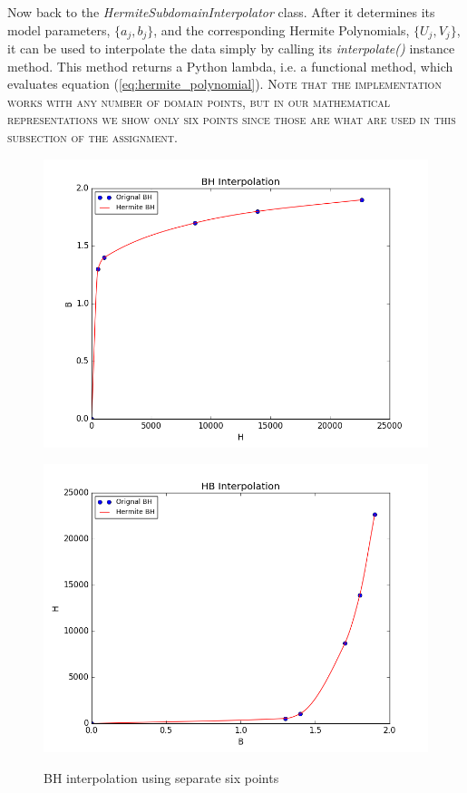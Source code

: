 \documentclass[11pt]{article}
\begin{document}
Now back to the \textit{HermiteSubdomainInterpolator} class. After it determines its model parameters, $\{a_j, b_j\}$, and the corresponding Hermite Polynomials, $\{U_j, V_j\}$, it can be used to interpolate the data simply by calling its \textit{interpolate()} instance method. This method returns a Python lambda, i.e. a functional method, which evaluates equation (\ref{eq:hermite_polynomial}).
\textsc{\footnotesize *Note that the implementation works with any number of domain points, but in our mathematical representations we show only six points since those are what are used in this subsection of the assignment.}
\begin{figure}[!hbp]
	\begin{center}
		\begin{minipage}{ 0.8\textwidth}
			\includegraphics[width= \textwidth]{H_BH_sep_six.png}\\
		\end{minipage}
		\begin{minipage}{ 0.8\textwidth}
			\includegraphics[width=\textwidth]{H_HB_sep_six.png}\\
		\end{minipage}
		\caption{\label{fig:H_BH_sep_six}BH interpolation using separate six points}
	\end{center}
\end{figure}
\end{document}
